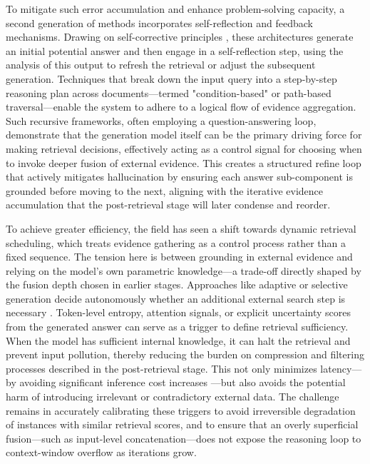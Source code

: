 \documentclass[11pt,a4paper]{article}
\begin{document}
To mitigate such error accumulation and enhance problem-solving capacity, a second generation of methods incorporates self-reflection and feedback mechanisms. Drawing on self-corrective principles \cite{arxiv:2401.15884v2}, these architectures generate an initial potential answer and then engage in a self-reflection step, using the analysis of this output to refresh the retrieval or adjust the subsequent generation. Techniques that break down the input query into a step-by-step reasoning plan across documents---termed "condition-based" or path-based traversal---enable the system to adhere to a logical flow of evidence aggregation. Such recursive frameworks, often employing a question-answering loop, demonstrate that the generation model itself can be the primary driving force for making retrieval decisions, effectively acting as a control signal for choosing when to invoke deeper fusion of external evidence. This creates a structured refine loop that actively mitigates hallucination by ensuring each answer sub-component is grounded before moving to the next, aligning with the iterative evidence accumulation that the post-retrieval stage will later condense and reorder.

To achieve greater efficiency, the field has seen a shift towards dynamic retrieval scheduling, which treats evidence gathering as a control process rather than a fixed sequence. The tension here is between grounding in external evidence and relying on the model's own parametric knowledge---a trade-off directly shaped by the fusion depth chosen in earlier stages. Approaches like adaptive or selective generation decide autonomously whether an additional external search step is necessary \cite{arxiv:2507.06956v1}. Token-level entropy, attention signals, or explicit uncertainty scores from the generated answer can serve as a trigger to define retrieval sufficiency. When the model has sufficient internal knowledge, it can halt the retrieval and prevent input pollution, thereby reducing the burden on compression and filtering processes described in the post-retrieval stage. This not only minimizes latency---by avoiding significant inference cost increases \cite{arxiv:2603.01783v1}---but also avoids the potential harm of introducing irrelevant or contradictory external data. The challenge remains in accurately calibrating these triggers to avoid irreversible degradation of instances with similar retrieval scores, and to ensure that an overly superficial fusion---such as input-level concatenation---does not expose the reasoning loop to context-window overflow as iterations grow.
\end{document}

